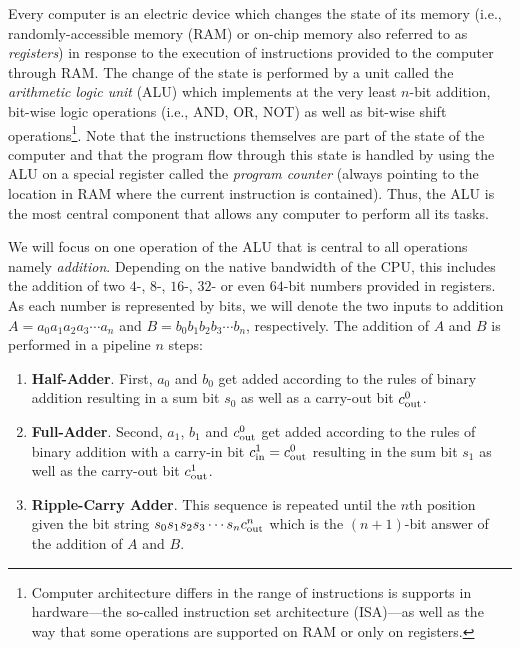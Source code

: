 \label{sec:adders}
Every computer is an electric device which changes the state of its memory (i.e., randomly-accessible memory (RAM) or on-chip memory also referred to as {\em registers}) in response to the execution of instructions provided to the computer through RAM. The change of the state is performed by a unit called the {\em arithmetic logic unit} (ALU) which implements at the very least $n$-bit addition, bit-wise logic operations (i.e., AND, OR, NOT) as well as bit-wise shift operations\footnote{Computer architecture differs in the range of instructions is supports in hardware---the so-called instruction set architecture (ISA)---as well as the way that some operations are supported on RAM or only on registers.}. Note that the instructions themselves are part of the state of the computer and that the program flow through this state is handled by using the ALU on a special register called the {\em program counter} (always pointing to the location in RAM where the current instruction is contained). Thus, the ALU is the most central component that allows any computer to perform all its tasks.

We will focus on one operation of the ALU that is central to all operations namely {\em addition}. Depending on the native bandwidth of the CPU, this includes the addition of two $4$-, $8$-, $16$-, $32$- or even $64$-bit numbers provided in registers. As each number is represented by bits, we will denote the two inputs to addition $A=a_0a_1a_2a_3\cdots a_n$ and $B=b_0b_1b_2b_3\cdots b_n$, respectively. The addition of $A$ and $B$ is performed in a pipeline $n$ steps:
\begin{enumerate}
    \item {\bf Half-Adder}. First, $a_0$ and $b_0$ get added according to the rules of binary addition resulting in a sum bit $s_0$ as well as a carry-out bit $c_{\mathrm{out}}^0$.
    \item {\bf Full-Adder}. Second, $a_1$, $b_1$ and $c_{\mathrm{out}}^0$ get added according to the rules of binary addition with a carry-in bit $c_{\mathrm{in}}^1=c_{\mathrm{out}}^0$ resulting in the sum bit $s_1$ as well as the carry-out bit $c_{\mathrm{out}}^1$.
    \item {\bf Ripple-Carry Adder}. This sequence is repeated until the $n$th position given the bit string $s_0s_1s_2s_3\cdots s_nc_{\mathrm{out}}^n$ which is the $(n+1)$-bit answer of the addition of $A$ and $B$.
\end{enumerate}

